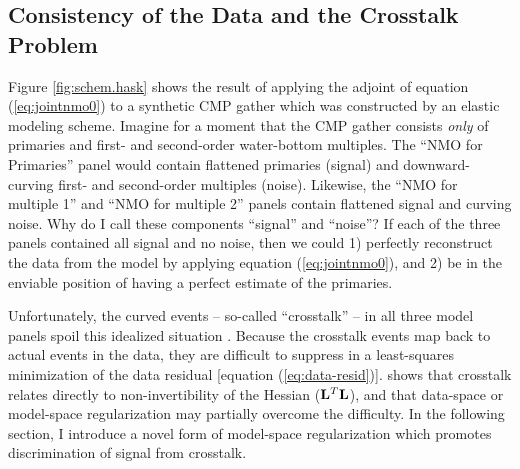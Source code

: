 \subsection{Consistency of the Data and the Crosstalk Problem}

Figure \ref{fig:schem.hask} shows the result of applying the adjoint of equation 
(\ref{eq:jointnmo0}) to a synthetic CMP gather which was constructed by an elastic modeling
scheme.  Imagine for a moment that the CMP gather consists {\em only} of primaries and
first- and second-order water-bottom multiples.   The ``NMO for Primaries'' panel would
contain flattened primaries (signal) and downward-curving first- and second-order 
multiples (noise).  Likewise, the ``NMO for multiple 1'' and ``NMO for multiple 2''
panels contain flattened signal and curving noise.  Why do I call these
components ``signal'' and ``noise''?  If each of the three panels contained all signal and 
no noise, then we could 1) perfectly reconstruct the data from the model by applying 
equation (\ref{eq:jointnmo0}), and 2) be in the enviable position of having a perfect 
estimate of the primaries.  
\par
Unfortunately, the curved events -- so-called ``crosstalk'' -- in all three model panels 
spoil this idealized situation \cite{Claerbout.blackwell.92}.  Because the crosstalk events 
map back to actual events in the data, they are difficult to suppress in a least-squares 
minimization of the data residual [equation (\ref{eq:data-resid})].  
shows that crosstalk relates directly to non-invertibility of the Hessian ($\bold L^T \bold L$), 
and that data-space or model-space regularization may partially overcome the difficulty.
In the following section, I introduce a novel form of model-space regularization which 
promotes discrimination of signal from crosstalk.

